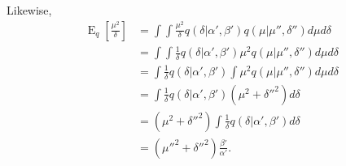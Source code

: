 \documentclass[12pt]{article}
\newcommand{\E}{\operatorname{E}}
\begin{document}
\begin{appendices}
Likewise,
\begin{align}
    \E_{q}[\frac{\mu^2}{\delta}] &= \int \int \frac{\mu^2}{\delta} q(\delta|\alpha', \beta')
    q(\mu|\mu'', \delta'') d\mu d\delta
    \nonumber \\
    &= \int \int \frac{1}{\delta} q(\delta|\alpha', \beta')
    \mu^2 q(\mu|\mu'', \delta'') d\mu d\delta
    \nonumber \\
    &= \int \frac{1}{\delta} q(\delta|\alpha', \beta')
    \int \mu^2 q(\mu|\mu'', \delta'') d\mu d\delta
    \nonumber \\
    &= \int \frac{1}{\delta} q(\delta|\alpha', \beta')
    (\mu^2 + \delta''^2) d\delta
    \nonumber \\
    &= (\mu^2 + \delta''^2) \int \frac{1}{\delta} q(\delta|\alpha', \beta')
    d\delta
    \nonumber \\
    &= (\mu''^2 + \delta''^2) \frac{\beta'}{\alpha'}.
\end{align}


\end{appendices}
\end{document}
